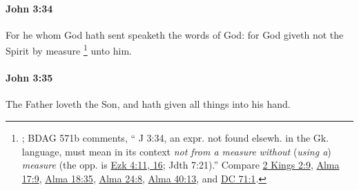 		\paragraph{John 3:34} %
			\label{JOHN-3-34}

			For he whom God hath sent speaketh the words of God: for God giveth not the Spirit by measure%
				\footnote{%
					; BDAG 571b comments, `` J 3:34, an expr. not found elsewh. in the Gk. language, must mean in its context \textit{not from a measure} \textit{without} (\textit{using a}) \textit{measure} (the opp. is  \hyperref[EZEKIEL-4-11]{Ezk 4:11, 16}; Jdth 7:21).'' Compare \hyperref[2KINGS-2-9]{2 Kings 2:9}, \hyperref[ALMA-17-9]{Alma 17:9}, \hyperref[ALMA-18-35]{Alma 18:35}, \hyperref[ALMA-24-8]{Alma 24:8}, \hyperref[ALMA-40-13]{Alma 40:13}, and \hyperref[DC71-1]{DC 71:1}.
					} 
			unto him.

			\begin{framed}
			\scriptsize
				\begin{compactdesc}
					\item[SBLG] 
				\end{compactdesc}
			\end{framed}

		\paragraph{John 3:35} %
			\label{JOHN-3-35}

			The Father loveth the Son, and hath given all things into his hand.

